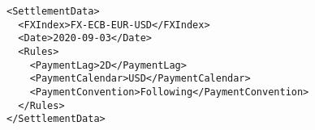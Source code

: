 \begin{listing}[H]
\begin{verbatim}
<SettlementData>
  <FXIndex>FX-ECB-EUR-USD</FXIndex>
  <Date>2020-09-03</Date>
  <Rules>
    <PaymentLag>2D</PaymentLag>
    <PaymentCalendar>USD</PaymentCalendar>
    <PaymentConvention>Following</PaymentConvention>
  </Rules>
</SettlementData>
\end{verbatim}
\caption{Example \lstinline!SettlementData! node with \lstinline!Rules! sub-node}
\label{lst:eq_settlement_data_node}
\end{listing}
